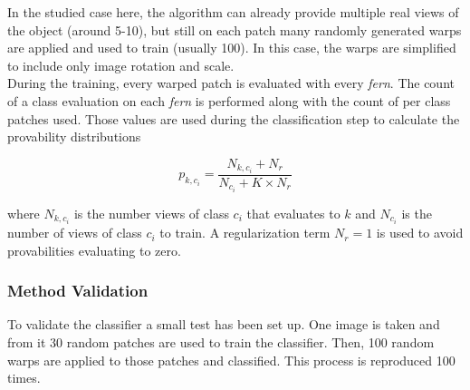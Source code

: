 In the studied case here, the algorithm can already provide multiple real views of the object (around 5-10), but still on each patch many randomly generated warps are applied and used to train (usually 100). In this case, the warps are simplified to include only image rotation and scale.\\

During the training, every warped patch is evaluated with every \textit{fern}. The count of a class evaluation on each \textit{fern} is performed along with the count of per class patches used. Those values are used during the classification step to calculate the provability distributions

\begin{equation}
  p_{k,c_i} = \frac{N_{k,c_i} + N_r}{N_{c_i} + K \times N_r}
\end{equation}

where $N_{k,c_i}$ is the number views of class $c_i$ that evaluates to $k$ and $N_{c_i}$ is the number of views of class $c_i$ to train. A regularization term $N_r = 1$ is used to avoid provabilities evaluating to zero.\\


\subsubsection{Method Validation}
\label{ssub:ferns_method_validation}

To validate the classifier a small test has been set up. One image is taken and from it 30 random patches are used to train the classifier. Then, 100 random warps are applied to those patches and classified. This process is reproduced 100 times. \\


